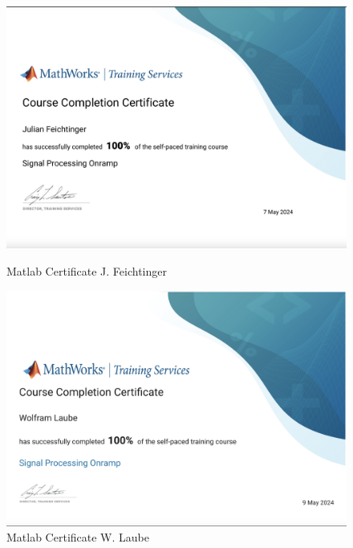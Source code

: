 \begin{figure}[!ht]
	\centering
	\begin{minipage}{0.49\textwidth}
		\centering
		\includegraphics[scale=0.2]{fig/20240509-matlab-jf-cert_sigproc}
		\caption{Matlab Certificate J. Feichtinger}
		\label{fig:matlab_cert_jf}
	\end{minipage}\hfill
	\begin{minipage}{0.49\textwidth}
		\centering
		\includegraphics[scale=0.2]{fig/20240509-matlab-wel-cert_sigproc}
		\caption{Matlab Certificate W. Laube}
		\label{fig:matlab_cert_wl}
	\end{minipage}
\end{figure}
